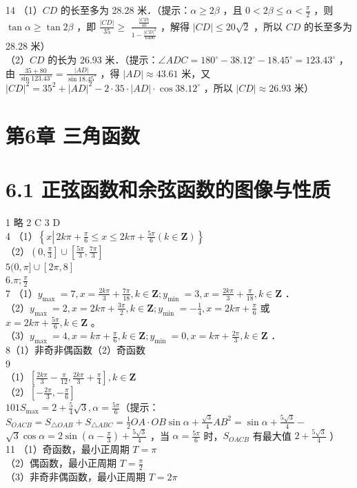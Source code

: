 \documentclass[10pt]{article}
\begin{document}
14 （1）\(C D\) 的长至多为 28.28 米．（提示：\(\alpha \geqslant 2 \beta\) ，且 \(0<2 \beta \leqslant \alpha<\frac{\pi}{2}\) ，则 \(\tan \alpha \geqslant \tan 2 \beta\) ，即 \(\frac{|C D|}{35} \geqslant\) \(\frac{\frac{|C D|}{40}}{1-\frac{|C D|^{2}}{6400}}\) ，解得 \(|C D| \leqslant 20 \sqrt{2}\) ，所以 \(C D\) 的长至多为 28.28 米）\\
（2）\(C D\) 的长为 26.93 米．（提示：\(\angle A D C=180^{\circ}-38.12^{\circ}-18.45^{\circ}=123.43^{\circ}\) ，由 \(\frac{35+80}{\sin 123.43^{\circ}}=\frac{|A D|}{\sin 18.45^{\circ}}\) ，得 \(|A D| \approx 43.61\) 米，又 \(|C D|^{2}=35^{2}+|A D|^{2}-2 \cdot 35 \cdot|A D| \cdot \cos 38.12^{\circ}\) ，所以 \(|C D| \approx 26.93\) 米）

\section*{第6章 三角函数}
\section*{6.1 正弦函数和余弦函数的图像与性质}
1 略 2 C 3 D\\
4 （1）\(\left\{x \left\lvert\, 2 k \pi+\frac{\pi}{6} \leqslant x \leqslant 2 k \pi+\frac{5 \pi}{6}(k \in \mathbf{Z})\right.\right\}\)\\
（2）\(\left(0, \frac{\pi}{3}\right] \cup\left[\frac{5 \pi}{3}, \frac{7 \pi}{3}\right]\)\\
\(5(0, \pi] \cup[2 \pi, 8]\)\\
\(6 . \pi ; \frac{\pi}{2}\)\\
7 （1）\(y_{\text {max }}=7, x=\frac{2 k \pi}{3}+\frac{7 \pi}{18}, k \in \mathbf{Z} ; y_{\text {min }}=3, x=\frac{2 k \pi}{3}+\frac{\pi}{18}, k \in \mathbf{Z}\) ．\\
（2）\(y_{\text {max }}=2, x=2 k \pi+\frac{3 \pi}{2}, k \in \mathbf{Z} ; y_{\text {min }}=-\frac{1}{4}, x=2 k \pi+\frac{\pi}{6}\) 或 \(x=2 k \pi+\frac{5 \pi}{6}, k \in \mathbf{Z}\) 。\\
（3）\(y_{\text {max }}=4, x=k \pi+\frac{\pi}{6}, k \in \mathbf{Z} ; y_{\text {min }}=0, x=k \pi+\frac{2 \pi}{3}, k \in \mathbf{Z}\) ．\\
8（1）非奇非偶函数（2）奇函数\\
9\\
（1）\(\left[\frac{2 k \pi}{3}-\frac{\pi}{12}, \frac{2 k \pi}{3}+\frac{\pi}{4}\right], k \in \mathbf{Z}\)\\
（2）\(\left[-\frac{2 \pi}{3},-\frac{\pi}{6}\right]\)\\
\(101 S_{\max }=2+\frac{5}{4} \sqrt{3}, \alpha=\frac{5 \pi}{6}\)（提示：\(S_{O A C B}=S_{\triangle O A B}+S_{\triangle A B C}=\frac{1}{2} O A \cdot O B \sin \alpha+\frac{\sqrt{3}}{4} A B^{2}=\sin \alpha+\frac{5 \sqrt{3}}{4}-\) \(\sqrt{3} \cos \alpha=2 \sin \left(\alpha-\frac{\pi}{3}\right)+\frac{5 \sqrt{3}}{4}\) ，当 \(\alpha=\frac{5 \pi}{6}\) 时，\(S_{O A C B}\) 有最大值 \(2+\frac{5 \sqrt{3}}{4}\) ）\\
11 （1）奇函数，最小正周期 \(T=\pi\)\\
（2）偶函数，最小正周期 \(T=\frac{\pi}{2}\)\\
（3）非奇非偶函数，最小正周期 \(T=2 \pi\)
\end{document}
